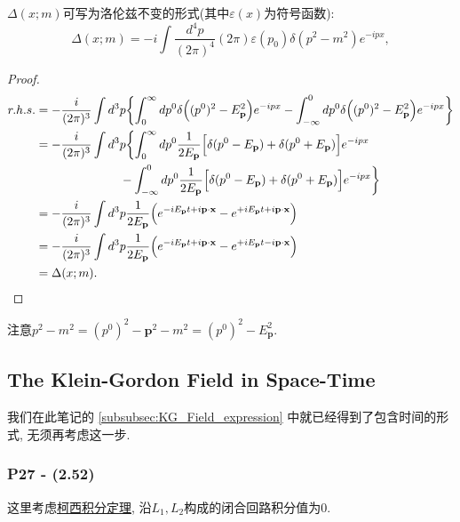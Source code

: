 \documentclass[cn,hazy,blue,11pt,device=normal,chinesefont=founder]{elegantnote}
\begin{document}
$\Delta(x; m)$可写为洛伦兹不变的形式(其中$\varepsilon(x)$为符号函数): 
\begin{equation}
  \Delta(x; m) = -i\int \frac{d^4 p}{(2\pi)^4}(2\pi)\varepsilon(p_0) \delta(p^2 - m^2)e^{-ipx}, 
\end{equation}

\begin{proof}
  \begin{equation}
    \begin{aligned}
      r. h. s. &= -\frac{i}{(2\pi)^3}\int d^3 p \biggl\{ \int_{0}^{\infty}dp^0\delta\Bigl((p^0)^2 - E_\mathbf{p}^2\Bigr)e^{-ipx} - \int_{-\infty}^{0}dp^0\delta\Bigl((p^0)^2 - E_\mathbf{p}^2\Bigr)e^{-ipx} \biggr\} \\
               &= -\frac{i}{(2\pi)^3}\int d^3 p \biggl\{ \int_{0}^{\infty}dp^0\frac{1}{2E_\mathbf{p}}\Bigl[\delta(p^0 - E_\mathbf{p}) + \delta(p^0 + E_\mathbf{p}) \Bigr]e^{-ipx} \\
               &\qquad \qquad \qquad \quad - 
               \int_{-\infty}^{0}dp^0\frac{1}{2E_\mathbf{p}}\Bigl[\delta(p^0 - E_\mathbf{p}) + \delta(p^0 + E_\mathbf{p}) \Bigr]e^{-ipx}\biggr\} \\
               &= -\frac{i}{(2\pi)^3} \int d^3 p \frac{1}{2E_\mathbf{p}} \Bigl(e^{-iE_\mathbf{p} t + i \mathbf{p} \cdot \mathbf{x}} - e^{+iE_\mathbf{p} t + i \mathbf{p} \cdot \mathbf{x}}\Bigr) \\ 
               &= -\frac{i}{(2\pi)^3} \int d^3 p \frac{1}{2E_\mathbf{p}} \Bigl(e^{-iE_\mathbf{p} t + i \mathbf{p} \cdot \mathbf{x}} - e^{+iE_\mathbf{p} t - i \mathbf{p} \cdot \mathbf{x}}\Bigr) \\
               &= \Delta(x; m). 
    \end{aligned}
  \end{equation}
\end{proof}

\begin{remark}
  注意$p^2 - m^2 = (p^0)^2 - \mathbf{p}^2 - m^2 = (p^0)^2 - E_\mathbf{p}^2$. 
\end{remark}

\subsection{The Klein-Gordon Field in Space-Time}

我们在此笔记的 \ref{subsubsec:KG_Field_expression} 中就已经得到了包含时间的形式, 无须再考虑这一步. 

\subsubsection{P27 - (2.52)}
这里考虑\href{https://zh.wikipedia.org/wiki/柯西积分定理}{柯西积分定理}, 
沿$L_1, L_2$构成的闭合回路积分值为0. 
\end{document}
